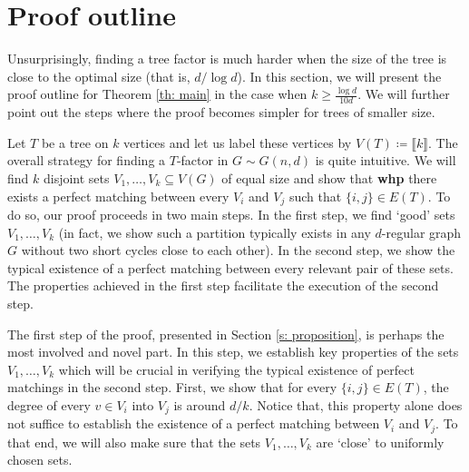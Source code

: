 \documentclass[notitlepage]{scrartcl}
\newcommand{\br}[1]{\llbracket{#1}\rrbracket}
\begin{document}
 
\section{Proof outline}\label{s: outline}
Unsurprisingly, finding a tree factor is much harder when the size of the tree is close to the optimal size (that is, $d/\log d$). In this section, we will present the proof outline for Theorem \ref{th: main} in the case when $k\geq\frac{\log d}{10d}$. We will further point out the steps where the proof becomes simpler for trees of smaller size.

Let $T$ be a tree on $k$ vertices and let us label these vertices by $V(T) \coloneqq \br{k}$. The overall strategy for finding a $T$-factor in $G \sim G(n, d)$ is quite intuitive. We will find $k$ disjoint sets $V_1, \dots, V_k \subseteq V(G)$ of equal size and show that \textbf{whp} there exists a perfect matching between every $V_i$ and $V_j$ such that $\{i,j\} \in E(T)$. To do so, our proof proceeds in two main steps. In the first step, we find `good' sets $V_1, \dots, V_k$ (in fact, we show such a partition typically exists in any $d$-regular graph $G$ without two short cycles close to each other). In the second step, we show the typical existence of a perfect matching between every relevant pair of these sets. The properties achieved in the first step facilitate the execution of the second step.

The first step of the proof, presented in Section \ref{s: proposition}, is perhaps the most involved and novel part. In this step, we establish key properties of the sets $V_1,\ldots, V_k$ which will be crucial in verifying the typical existence of perfect matchings in the second step. First, we show that for every $\{i,j\}\in E(T)$, the degree of every $v \in V_i$ into $V_j$ is around $d/k$. Notice that, this property alone does not suffice to establish the existence of a perfect matching between $V_i$ and $V_j$. To that end, we will also make sure that the sets $V_1, \dots, V_k$ are `close' to uniformly chosen sets. 
\end{document}
